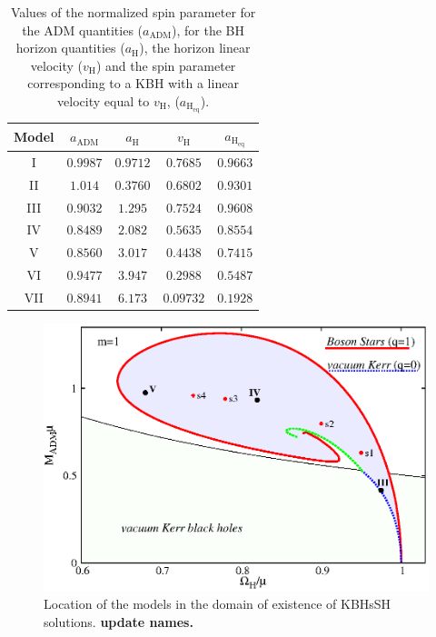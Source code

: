 \documentclass[twocolumn,aps,showpacs,showkeys,prd,superscriptaddress,byrevtex, amsmath]{revtex4-1}
\begin{document}
\begin{table}
\caption{Values of the normalized spin parameter for the ADM quantities ($a_{\mathrm{ADM}}$), for the BH horizon quantities ($a_{\mathrm{H}}$), the horizon linear velocity ($v_{\mathrm{H}}$) and the spin parameter corresponding to a KBH with a linear velocity equal to $v_{\mathrm{H}}$, ($a_{\mathrm{H_{eq}}}$).}        
\label{models_spin_vel}      
\centering          
\begin{tabular}{c c c c c}
\hline\hline       
 Model & $a_{\mathrm{ADM}}$ & $a_{\mathrm{H}}$ & $v_{\mathrm{H}}$ & $a_{\mathrm{H_{eq}}}$ \\ 
\hline           
I & $0.9987$ & $0.9712$ & $0.7685$ & $0.9663$ \\ 
 \hline 
II & $1.014$ & $0.3760$ & $0.6802$ & $0.9301$ \\
 \hline 
III & $0.9032$ & $1.295$ & $0.7524$ & $0.9608$ \\ 
 \hline 
IV & $0.8489$ & $2.082$ & $0.5635$ & $0.8554$ \\ 
 \hline 
V & $0.8560$ & $3.017$ & $0.4438$ & $0.7415$ \\ 
 \hline 
VI & $0.9477$ & $3.947$ & $0.2988$ & $0.5487$ \\ 
 \hline 
VII & $0.8941$ & $6.173$ & $0.09732$ & $0.1928$ \\ 
\hline      
\end{tabular}
\end{table}


\begin{figure}
\hspace{-0.3cm}
\includegraphics[scale=0.57]{figures/existence.eps}
\hspace{-0.2cm}
\caption{Location of the models in the domain of existence of KBHsSH solutions. \textbf{update names.}}
\label{existance}
\end{figure}
\end{document}
